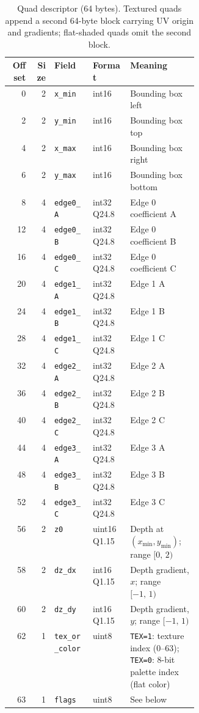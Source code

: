 \documentclass[11pt]{article}
\begin{document}
\begin{table}[h]
\centering
\small
\begin{tabular}{rrllp{0.36\linewidth}}
\toprule
\textbf{Offset} & \textbf{Size} & \textbf{Field} & \textbf{Format} & \textbf{Meaning} \\
\midrule
 0 & 2 & \texttt{x\_min}    & int16             & Bounding box left \\
 2 & 2 & \texttt{y\_min}    & int16             & Bounding box top \\
 4 & 2 & \texttt{x\_max}    & int16             & Bounding box right \\
 6 & 2 & \texttt{y\_max}    & int16             & Bounding box bottom \\
 8 & 4 & \texttt{edge0\_A}  & int32 Q24.8       & Edge 0 coefficient A \\
12 & 4 & \texttt{edge0\_B}  & int32 Q24.8       & Edge 0 coefficient B \\
16 & 4 & \texttt{edge0\_C}  & int32 Q24.8       & Edge 0 coefficient C \\
20 & 4 & \texttt{edge1\_A}  & int32 Q24.8       & Edge 1 A \\
24 & 4 & \texttt{edge1\_B}  & int32 Q24.8       & Edge 1 B \\
28 & 4 & \texttt{edge1\_C}  & int32 Q24.8       & Edge 1 C \\
32 & 4 & \texttt{edge2\_A}  & int32 Q24.8       & Edge 2 A \\
36 & 4 & \texttt{edge2\_B}  & int32 Q24.8       & Edge 2 B \\
40 & 4 & \texttt{edge2\_C}  & int32 Q24.8       & Edge 2 C \\
44 & 4 & \texttt{edge3\_A}  & int32 Q24.8       & Edge 3 A \\
48 & 4 & \texttt{edge3\_B}  & int32 Q24.8       & Edge 3 B \\
52 & 4 & \texttt{edge3\_C}  & int32 Q24.8       & Edge 3 C \\
56 & 2 & \texttt{z0}        & uint16 Q1.15      & Depth at $(x_{\min}, y_{\min})$; range $[0,\,2)$ \\
58 & 2 & \texttt{dz\_dx}    & int16 Q1.15       & Depth gradient, $x$; range $[-1,\,1)$ \\
60 & 2 & \texttt{dz\_dy}    & int16 Q1.15       & Depth gradient, $y$; range $[-1,\,1)$ \\
62 & 1 & \texttt{tex\_or\_color} & uint8         & \texttt{TEX=1}: texture index (0--63); \texttt{TEX=0}: 8-bit palette index (flat color) \\
63 & 1 & \texttt{flags}     & uint8             & See below \\
\bottomrule
\end{tabular}
\caption{Quad descriptor (64 bytes). Textured quads append a second 64-byte block carrying UV origin and gradients; flat-shaded quads omit the second block.}
\label{tab:quaddesc}
\end{table}
\end{document}
